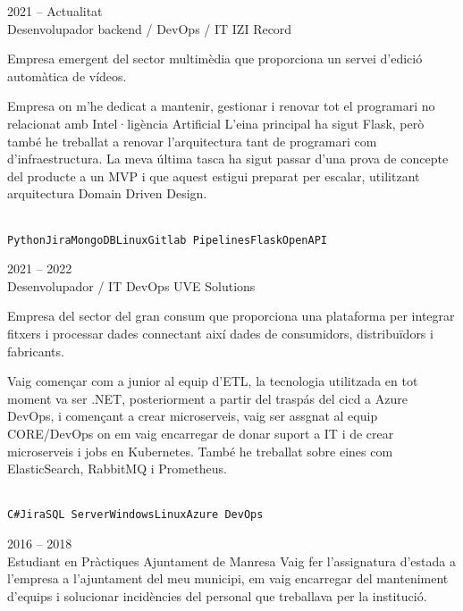 \documentclass[9pt]{developercv} %
\begin{document}
\begin{entrylist}
	\entry
		{2021 -- Actualitat\\}
		{Desenvolupador backend / DevOps / IT}
		{IZI Record}
		{Empresa emergent del sector multimèdia que proporciona un servei d'edició automàtica de vídeos.

		Empresa on m'he dedicat a mantenir, gestionar i renovar tot el programari no relacionat amb Intel·ligència Artificial  L'eina principal ha sigut Flask, però també he treballat a renovar
		l'arquitectura tant de programari com d'infraestructura. La meva última tasca ha sigut passar d'una prova de concepte del producte a un MVP i que aquest estigui preparat per escalar, utilitzant arquitectura Domain Driven Design.

		\\ \texttt{Python}\slashsep\texttt{Jira}\slashsep\texttt{MongoDB}\slashsep\texttt{Linux}\slashsep\texttt{Gitlab Pipelines}\slashsep\texttt{Flask}\slashsep\texttt{OpenAPI}}

	\entry
		{2021 -- 2022\\}
		{Desenvolupador / IT DevOps}
		{UVE Solutions}
		{Empresa del sector del gran consum que proporciona una plataforma per integrar fitxers i
		processar dades connectant així dades de consumidors, distribuïdors i fabricants.

		Vaig començar com a junior al equip d’ETL, la tecnologia utilitzada en tot moment va ser .NET, posteriorment a partir del traspás del cicd a Azure DevOps, i començant a crear microserveis, vaig ser
		assgnat al equip CORE/DevOps on em vaig encarregar de donar suport a IT i de crear microserveis
		i jobs en Kubernetes.
		També he treballat sobre eines com ElasticSearch, RabbitMQ i Prometheus.
		
		\\ \texttt{C\#}\slashsep\texttt{Jira}\slashsep\texttt{SQL Server}\slashsep\texttt{Windows}\slashsep\texttt{Linux}\slashsep\texttt{Azure DevOps}}

	\entry
		{2016 -- 2018\\}
		{Estudiant en Pràctiques}
		{Ajuntament de Manresa}
		{ 
			Vaig fer l'assignatura d'estada a l'empresa a l'ajuntament del meu municipi, em vaig encarregar del manteniment d'equips i solucionar incidències del personal que treballava per la institució. 
			}

\end{entrylist}

\end{document}
